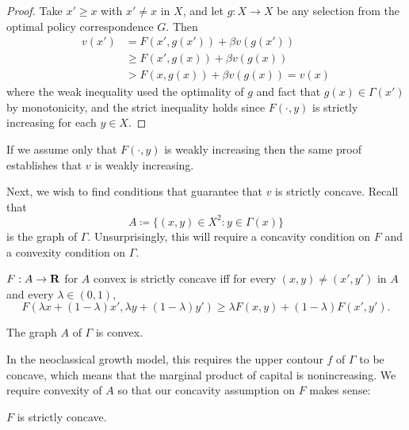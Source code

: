 \documentclass[11pt,letterpaper,reqno,oneside]{article}
\begin{document}
\begin{proof}
	Take $x'\geq x$ with $x' \neq x$ in $X$, and let $g : X \to X$ be any selection from the optimal policy correspondence $G$. Then
	\begin{align*}
		v(x') 
		&= F(x',g(x')) + \beta v(g(x'))
		\\
		&\geq
		F(x',g(x)) + \beta v(g(x))
		\\
		&>
		F(x,g(x)) + \beta v(g(x))
		= v(x) 
	\end{align*}
	where the weak inequality used the optimality of $g$ and fact that $g(x) \in \Gamma(x')$ by monotonicity, and the strict inequality holds since $F(\cdot,y)$ is strictly increasing for each $y \in X$.
\end{proof}

\begin{remark}
	If we assume only that $F(\cdot,y)$ is weakly increasing then the same proof establishes that $v$ is weakly increasing.
\end{remark}


Next, we wish to find conditions that guarantee that $v$ is strictly concave. Recall that
%
\begin{equation*}
	A \coloneqq \{ (x,y) \in X^2 : y \in \Gamma(x) \}
\end{equation*}
%
is the graph of $\Gamma$. Unsurprisingly, this will require a concavity condition on $F$ and a convexity condition on $\Gamma$.

\begin{definition}
	$F : A \to \mathbf{R}$ for $A$ convex is strictly concave iff for every $(x,y) \neq (x',y')$ in $A$ and every $\lambda \in (0,1)$,
	\begin{equation*}
		F( \lambda x + (1-\lambda) x', \lambda y + (1-\lambda) y' )
		\geq \lambda F( x, y ) + (1-\lambda) F( x', y' ) .
	\end{equation*}
\end{definition}


\begin{assumption}
	The graph $A$ of $\Gamma$ is convex.
\end{assumption}

In the neoclassical growth model, this requires the upper contour $f$ of $\Gamma$ to be concave, which means that the marginal product of capital is nonincreasing. We require convexity of $A$ so that our concavity assumption on $F$ makes sense:


\begin{assumption}
	$F$ is strictly concave.
\end{assumption}
\end{document}
